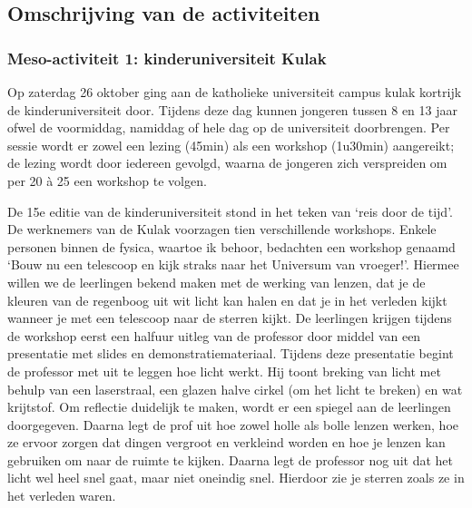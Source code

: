 \documentclass[a4paper,12pt,twoside]{article}%
\begin{document}
	\subsection{Omschrijving van de activiteiten}
	\subsubsection{Meso-activiteit 1: kinderuniversiteit Kulak}  Op zaterdag 26 oktober ging aan de katholieke universiteit campus kulak kortrijk de kinderuniversiteit door. Tijdens deze dag kunnen jongeren tussen 8 en 13 jaar ofwel de voormiddag, namiddag of hele dag op de universiteit doorbrengen. Per sessie wordt er zowel een lezing (45min) als een workshop (1u30min) aangereikt; de lezing wordt door iedereen gevolgd, waarna de jongeren zich verspreiden om per 20 à 25 een workshop te volgen.\newline
	
	
	De 15e editie van de kinderuniversiteit stond in het teken van `reis door de tijd'. De werknemers van de Kulak voorzagen tien verschillende workshops. Enkele personen binnen de fysica, waartoe ik behoor, bedachten een workshop genaamd `Bouw nu een telescoop en kijk straks naar het Universum van vroeger!'. Hiermee willen we de leerlingen bekend maken met de werking van lenzen, dat je de kleuren van de regenboog uit wit licht kan halen en dat je in het verleden kijkt wanneer je met een telescoop naar de sterren kijkt. De leerlingen krijgen tijdens de workshop eerst een halfuur uitleg van de professor door middel van een presentatie met slides en demonstratiemateriaal. Tijdens deze presentatie begint de professor met uit te leggen hoe licht werkt. Hij toont breking van licht met behulp van een laserstraal, een glazen halve cirkel (om het licht te breken) en wat krijtstof. Om reflectie duidelijk te maken, wordt er een spiegel aan de leerlingen doorgegeven. Daarna legt de prof uit hoe zowel holle als bolle lenzen werken, hoe ze ervoor zorgen dat dingen vergroot en verkleind worden en hoe je lenzen kan gebruiken om naar de ruimte te kijken. Daarna legt de professor nog uit dat het licht wel heel snel gaat, maar niet oneindig snel. Hierdoor zie je sterren zoals ze in het verleden waren. \newline\newline
	
\end{document}
